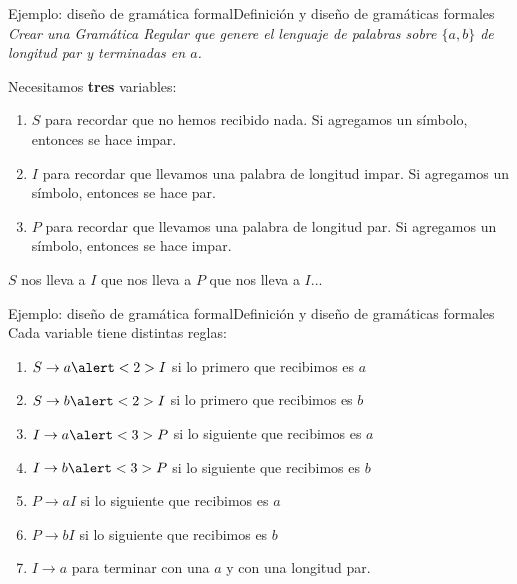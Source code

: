 \documentclass[spanish]{beamer}
\begin{document}
\begin{frame}{Ejemplo: diseño de gramática formal}{Definición y diseño de gramáticas formales}
    {\large \textit{Crear una Gramática Regular que genere el lenguaje de palabras sobre $\{a,b\}$ de longitud par y terminadas en $a$.}} \pause

    \bigskip

    Necesitamos \textbf{tres} variables: \pause

    \begin{enumerate}
        \item $S$ para recordar que no hemos recibido nada. Si agregamos un símbolo, entonces se hace impar. \pause
        \item $I$ para recordar que llevamos una palabra de longitud impar. Si agregamos un símbolo, entonces se hace par. \pause
        \item $P$ para recordar que llevamos una palabra de longitud par. Si agregamos un símbolo, entonces se hace impar.
    \end{enumerate} \pause

    $S$ nos lleva a $I$ que nos lleva a $P$ que nos lleva a $I$...
    
\end{frame}

\begin{frame}{Ejemplo: diseño de gramática formal}{Definición y diseño de gramáticas formales}
    Cada variable tiene distintas reglas: \pause

    \bigskip


    \begin{enumerate}
        \itemsep1.5ex
        \item<2-> $S \to a\alert<2>{I}$ si lo primero que recibimos es $a$
        \item<2-> $S \to b\alert<2>{I}$ si lo primero que recibimos es $b$
        \item<3-> $I \to a\alert<3>{P}$ si lo siguiente que recibimos es $a$
        \item<3-> $I \to b\alert<3>{P}$ si lo siguiente que recibimos es $b$
        \item<4-> $P \to aI$ si lo siguiente que recibimos es $a$ \pause
        \item<4-> $P \to bI$ si lo siguiente que recibimos es $b$ \pause
        \item<4-> $I \to a$ para terminar con una $a$ y con una longitud par.
    \end{enumerate}
    
\end{frame}


% 
% 
\end{document}

